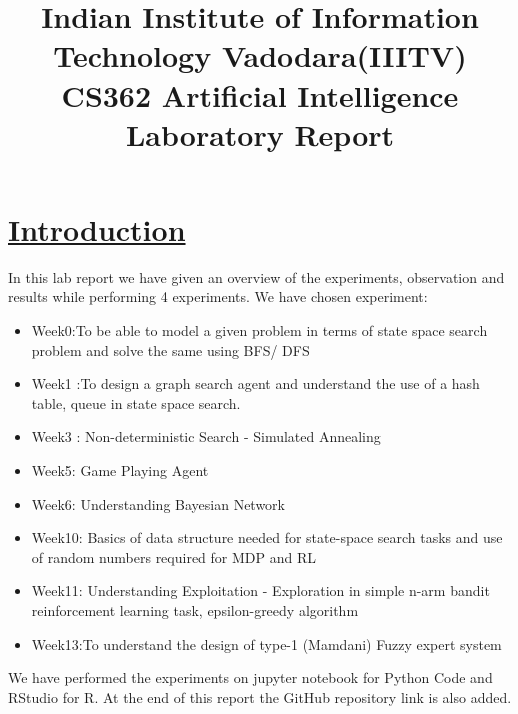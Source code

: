 \documentclass[15pt,journal]{IEEEtran}
\begin{document}
\title{\LARGE{ \textbf{ Indian Institute of Information Technology Vadodara(IIITV)}}\\ \LARGE{CS362 Artificial Intelligence Laboratory Report}}



\author{\Large{
}%
}




\maketitle

\section{\large{\underline{Introduction}}}
In this lab report we have given an overview of the experiments, observation and results while performing 4 experiments. We have chosen experiment:
\begin{itemize}
    \item Week0:To be able to model a given problem in terms of state space search problem and solve the same using BFS/ DFS

    \item Week1 :To design a graph search agent and understand the use of a hash table, queue in state space search.
    \item Week3 : Non-deterministic Search - Simulated Annealing
    \item Week5: Game Playing Agent
    \item Week6: Understanding Bayesian Network
    \item Week10: Basics of data structure needed for state-space search tasks and use of random numbers required for MDP and RL
    \item Week11: Understanding Exploitation - Exploration in simple n-arm bandit reinforcement learning task, epsilon-greedy algorithm
    \item Week13:To understand the design of type-1 (Mamdani) Fuzzy expert system

\end{itemize}
We have performed the experiments on jupyter notebook for Python Code and RStudio for R. At the end of this report the GitHub repository link is also added.
\end{document}
